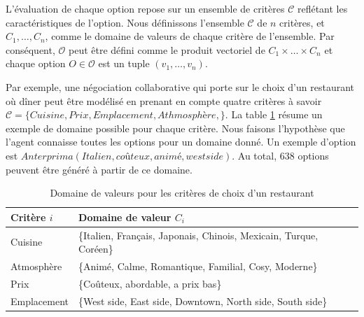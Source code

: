 		L'évaluation de chaque option repose sur un ensemble de critères $\mathcal{C}$ reflétant les caractéristiques de l'option. Nous définissons l'ensemble $\mathcal{C}$ de $n$ critères, et $C_1,\ldots,C_n$, comme le domaine de valeurs de chaque critère de l'ensemble. 
		Par conséquent, $\mathcal{O}$ peut être défini comme le produit vectoriel de  $C_1\times\ldots\times C_n$ et chaque option $O \in \mathcal{O}$ est un tuple $(v_1,\ldots,v_n)$. 
		
		Par exemple, une négociation collaborative qui porte sur le choix d'un restaurant où dîner peut être modélisé en prenant en compte quatre critères à savoir $\mathcal{C} = \{Cuisine, Prix, Emplacement, Athmosphère, \}$. La table \ref{tab:domain} résume un exemple de domaine possible pour chaque critère. Nous faisons l'hypothèse que l'agent connaisse toutes les options pour un domaine donné. Un exemple d'option est $ Anterprima(Italien, coûteux , animé, west side)$. Au total, $638$ options peuvent être généré à partir de ce domaine. 
		\begin{table}[h]
			\centering
			\begin{tabular}{|p{2.25cm}|p{9.25cm}|}
				\hline
				Critère $i $ & Domaine de valeur $C_i$ \\
				\hline
				Cuisine & \{Italien, Français, Japonais, Chinois, Mexicain, Turque, Coréen\} \\
				\hline
				Atmosphère & \{Animé, Calme, Romantique, Familial, Cosy, Moderne\} \\
				\hline
				Prix & \{Coûteux, abordable, a prix bas\} \\
				\hline
				Emplacement & \{West side, East side, Downtown, North side, South side\} \\
				\hline
				
			\end{tabular}
			\caption{Domaine de valeurs pour les critères de choix d'un restaurant} 
			\label{tab:domain}
		\end{table}
		

